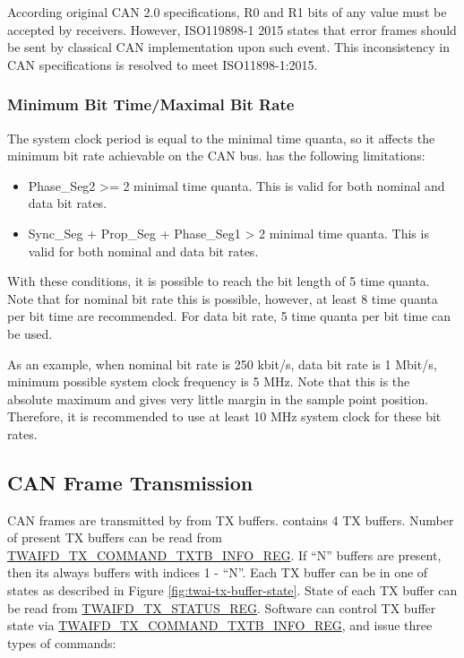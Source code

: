 \documentclass[main\_\_EN.tex]{subfiles}
\begin{document}
According original CAN 2.0 specifications, R0 and R1 bits of any value must be accepted by receivers. However, ISO119898-1 2015 states that error frames should be sent by classical CAN implementation upon such event. This inconsistency in CAN specifications is resolved to meet ISO11898-1:2015.


\subsubsection{Minimum Bit Time/Maximal Bit Rate}

The system clock period is equal to the minimal time quanta, so it affects the minimum bit rate achievable on the CAN bus. \modulename{} has the following limitations:

\begin{itemize}
    \item Phase\_Seg2 >= 2 minimal time quanta. This is valid for both nominal and data bit rates.
    \item Sync\_Seg + Prop\_Seg + Phase\_Seg1 > 2 minimal time quanta. This is valid for both nominal and data bit rates.
\end{itemize}

With these conditions, it is possible to reach the bit length of 5 time quanta. Note that for nominal bit rate this is possible, however, at least 8 time quanta per bit time are recommended.
For data bit rate, 5 time quanta per bit time can be used.

As an example, when nominal bit rate is 250 kbit/s, data bit rate is 1 Mbit/s, minimum possible system clock frequency is 5 MHz. Note that this is the absolute maximum and gives very little margin in the sample point position. Therefore, it is recommended to use at least 10 MHz system clock for these bit rates.


\subsection{CAN Frame Transmission}
\label{sec:twai-can-frame-trans}


CAN frames are transmitted by \modulename{} from TX buffers. \modulename{} contains 4 TX buffers. Number of present TX buffers can be read from \hyperref[regdesc:TWAIFDTXCOMMANDTXTBINFOREG]{TWAIFD\_TX\_COMMAND\_TXTB\_INFO\_REG}. If ``N'' buffers are present, then its always buffers with indices 1 - ``N''. Each TX buffer can be in one of states as described in Figure \ref{fig:twai-tx-buffer-state}. State of each TX buffer can be read from \hyperref[regdesc:TWAIFDTXSTATUSREG]{TWAIFD\_TX\_STATUS\_REG}. Software can control TX buffer state via \hyperref[regdesc:TWAIFDTXCOMMANDTXTBINFOREG]{TWAIFD\_TX\_COMMAND\_TXTB\_INFO\_REG}, and issue three types of commands:
\end{document}
